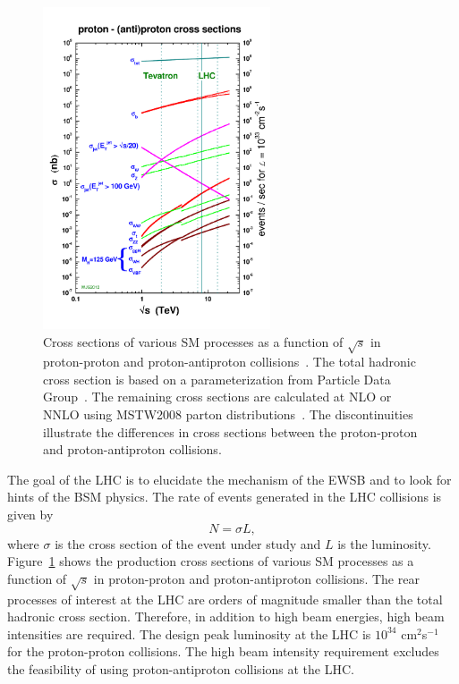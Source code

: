 \begin{figure}[h]
\centering
\includegraphics[width=0.6\textwidth]{figures_chapter2/crosssections2013}
\caption{Cross sections of various SM processes as a function of $\sqrt{s}$ in proton-proton and proton-antiproton collisions~\cite{sterling}. The total hadronic cross section is based on a parameterization from Particle Data Group~\cite{Agashe:2014kda}. The remaining cross sections are calculated at NLO or NNLO using MSTW2008 parton distributions~\cite{MSTW}. The discontinuities illustrate the differences in cross sections between the proton-proton and proton-antiproton collisions.}
\label{fig:xsec}
\end{figure}

The goal of the LHC is to elucidate the mechanism of the EWSB and to look for hints of the BSM physics. The rate of events generated in the LHC collisions is given by 
\begin{equation} \label{eq:lumi}
N = \sigma L,
\end{equation}
where $\sigma$ is the cross section of the event under study and $L$ is the luminosity. Figure~\ref{fig:xsec} shows the production cross sections of various SM processes as a function of $\sqrt{s}$ in proton-proton and proton-antiproton collisions. The rear processes of interest at the LHC are orders of magnitude smaller than the total hadronic cross section. Therefore, in addition to high beam energies, high beam intensities are required. The design peak luminosity at the LHC is $10^{34}$ cm$^2$s$^{-1}$ for the proton-proton collisions. The high beam intensity requirement excludes the feasibility of using proton-antiproton collisions at the LHC. 



